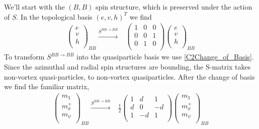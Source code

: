 \documentclass[12pt,a4paper]{article}
\newcounter{arrow}
\newcommand{\unit}{\mathds{1}}
\newcommand\be            {\begin{equation}}
\newcommand\ee            {\end{equation}}
\begin{document}
We'll start with the $(B,B)$ spin structure, which is preserved under the action of $S$. 
In the topological basis $(e,v,h)^T$ we find
\begin{align}
\left( \begin{matrix}
e\\
v\\
h\\
\end{matrix} \right)_{BB} 
\xrightarrow{S^{BB \rightarrow BB}} & \left( \begin{matrix}
1&0&0\\
0&0&1\\
0&1&0\\
\end{matrix} \right)
\left( \begin{matrix}
e\\
v\\
h\\
\end{matrix} \right)_{BB}
\end{align}
To transform $S^{BB\rightarrow BB}$ into the quasiparticle basis we use \eqref{C2Change_of_Basis}.
Since the azimuthal and radial spin structures are bounding, the S-matrix takes non-vortex quasi-particles, to non-vortex quasiparticles.
After the change of basis we find the familiar matrix,
\begin{align}
\left( \begin{matrix}
m_\unit\\
m_\sigma^+\\
m_\psi \\
\end{matrix} \right)_{BB} 
\xrightarrow{S^{BB \rightarrow BB}} &\frac{1}{2} \left( \begin{matrix}
1&d&1\\
d&0&-d\\
1&-d&1\\
\end{matrix} \right)
\left( \begin{matrix}
m_\unit\\
m_\sigma^+\\
m_\psi \\
\end{matrix} \right)_{BB}
\end{align}
\end{document}
